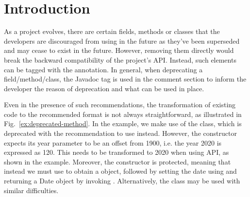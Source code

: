 \documentclass[runningheads,a4paper]{llncs}
\begin{document}






\section{Introduction}

As a project evolves, there are certain fields, methods or classes
that the developers are discouraged from using in the future as
they've been superseded and may cease to exist in the future.
However, removing them directly would break the backward compatibility
of the project's API.  Instead, such elements can be tagged with the
 annotation.  In general, when deprecating a
field/method/class, the  Javadoc tag is used in the
comment section to inform the developer the reason of deprecation and
what can be used in place.



Even in the presence of such recommendations, the transformation of
existing code to the recommended format is not always straightforward,
as illustrated in Fig.~\ref{ex:deprecated-method}. In the example, we
make use of the  class, which is deprecated with the
recommendation to use  instead.  However, the
 constructor expects its year parameter to be an offset
from 1900, i.e. the year 2020 is expressed as 120.  This needs to be
transformed to 2020 when using  API, as shown in the
example. Moreover, the  constructor is protected,
meaning that instead we must use  to obtain a
 object, followed by setting the date using 
and returning a Date object by invoking .
Alternatively, the  class may be used with
similar difficulties.
\end{document}
